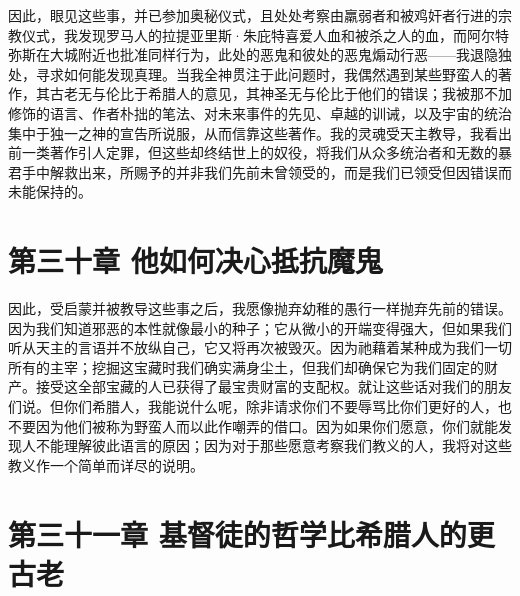 因此，眼见这些事，并已参加奥秘仪式，且处处考察由羸弱者和被鸡奸者行进的宗教仪式，我发现罗马人的拉提亚里斯·朱庇特喜爱人血和被杀之人的血，而阿尔特弥斯在大城附近也批准同样行为，此处的恶鬼和彼处的恶鬼煽动行恶——我退隐独处，寻求如何能发现真理。当我全神贯注于此问题时，我偶然遇到某些野蛮人的著作，其古老无与伦比于希腊人的意见，其神圣无与伦比于他们的错误；我被那不加修饰的语言、作者朴拙的笔法、对未来事件的先见、卓越的训诫，以及宇宙的统治集中于独一之神的宣告所说服，从而信靠这些著作。我的灵魂受天主教导，我看出前一类著作引人定罪，但这些却终结世上的奴役，将我们从众多统治者和无数的暴君手中解救出来，所赐予的并非我们先前未曾领受的，而是我们已领受但因错误而未能保持的。\par


\section{第三十章 他如何决心抵抗魔鬼}

因此，受启蒙并被教导这些事之后，我愿像抛弃幼稚的愚行一样抛弃先前的错误。因为我们知道邪恶的本性就像最小的种子；它从微小的开端变得强大，但如果我们听从天主的言语并不放纵自己，它又将再次被毁灭。因为祂藉着某种成为我们一切所有的主宰；挖掘这宝藏时我们确实满身尘土，但我们却确保它为我们固定的财产。接受这全部宝藏的人已获得了最宝贵财富的支配权。就让这些话对我们的朋友们说。但你们希腊人，我能说什么呢，除非请求你们不要辱骂比你们更好的人，也不要因为他们被称为野蛮人而以此作嘲弄的借口。因为如果你们愿意，你们就能发现人不能理解彼此语言的原因；因为对于那些愿意考察我们教义的人，我将对这些教义作一个简单而详尽的说明。\par


\section{第三十一章 基督徒的哲学比希腊人的更古老}

